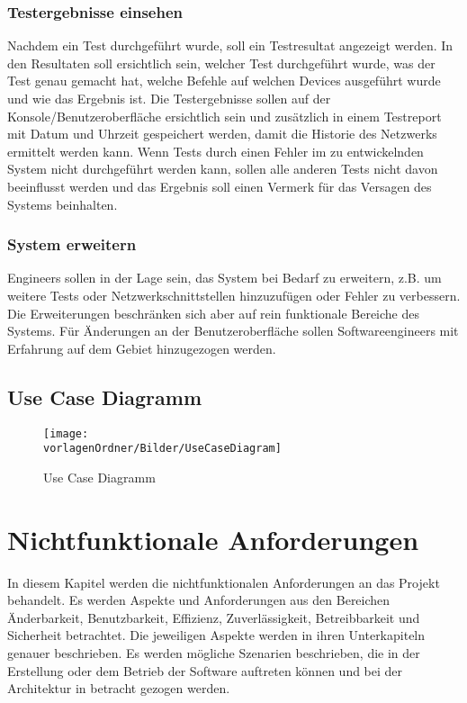 \documentclass[
	ngerman,
	toc=listof, %
	toc=bibliography, %
	footnotes=multiple, %
	parskip=half, %
	numbers=noendperiod %
]{scrartcl}
\newcommand{\vorlagenOrdner}{../../99_Vorlagen} %
\begin{document}
		\subsubsection{Testergebnisse einsehen}
			Nachdem ein Test durchgeführt wurde, soll ein Testresultat angezeigt werden.
			In den Resultaten soll ersichtlich sein, welcher Test durchgeführt wurde, was der Test genau gemacht hat, welche Befehle auf welchen Devices ausgeführt wurde und wie das Ergebnis ist.
			Die Testergebnisse sollen auf der Konsole/Benutzeroberfläche ersichtlich sein und zusätzlich in einem Testreport mit Datum und Uhrzeit gespeichert werden, damit die Historie des Netzwerks ermittelt werden kann.
			Wenn Tests durch einen Fehler im zu entwickelnden System nicht durchgeführt werden kann, sollen alle anderen Tests nicht davon beeinflusst werden und das Ergebnis soll einen Vermerk für das Versagen des Systems beinhalten.
	
		\subsubsection{System erweitern}
			Engineers sollen in der Lage sein, das System bei Bedarf zu erweitern, z.B. um weitere Tests oder Netzwerkschnittstellen hinzuzufügen oder Fehler zu verbessern.
			Die Erweiterungen beschränken sich aber auf rein funktionale Bereiche des Systems. Für Änderungen an der Benutzeroberfläche sollen Softwareengineers mit Erfahrung auf dem Gebiet hinzugezogen werden.
			 
			
	\subsection{Use Case Diagramm}
	\begin{figure}[!h]
		\begin{center}
			\texttt{[image: \\vorlagenOrdner/Bilder/UseCaseDiagram]}
		\end{center}
		\caption{Use Case Diagramm}
	\end{figure}
		
\section{Nichtfunktionale Anforderungen}
	In diesem Kapitel werden die nichtfunktionalen Anforderungen an das Projekt behandelt.
	Es werden Aspekte und Anforderungen aus den Bereichen Änderbarkeit, Benutzbarkeit, Effizienz, Zuverlässigkeit, Betreibbarkeit und Sicherheit betrachtet.
	Die jeweiligen Aspekte werden in ihren Unterkapiteln genauer beschrieben.
	Es werden mögliche Szenarien beschrieben, die in der Erstellung oder dem Betrieb der Software auftreten können und bei der Architektur in betracht gezogen werden.
\end{document}
